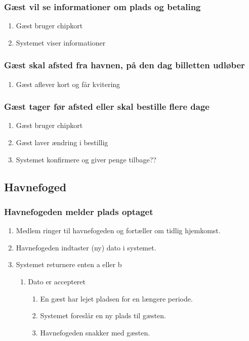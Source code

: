 \subsubsection{Gæst vil se informationer om plads og betaling}
  \begin{enumerate}
    \item Gæst bruger chipkort
    \item Systemet viser informationer
  \end{enumerate}

\subsubsection{Gæst skal afsted fra havnen, på den dag billetten udløber}
  \begin{enumerate}
    \item Gæst aflever kort og får kvitering
  \end{enumerate}

\subsubsection{Gæst tager før afsted eller skal bestille flere dage}
  \begin{enumerate}
    \item Gæst bruger chipkort
    \item Gæst laver ændring i bestillig
    \item Systemet konfirmere og giver penge tilbage??
  \end{enumerate}

\subsection{Havnefoged}

    \subsubsection{Havnefogeden melder plads optaget}

    \begin{enumerate}
      \item Medlem ringer til havnefogeden og fortæller om tidlig hjemkomst.
      \item Havnefogeden indtaster (ny) dato i systemet.
      \item Systemet returnere enten a eller b
      \begin{enumerate}
        \item Dato er accepteret
        \begin{enumerate}
          \item En gæst har lejet pladsen for en længere periode.
          \item Systemet foreslår en ny plads til gæsten.
          \item Havnefogeden snakker med gæsten.
        \end{enumerate}
      \end{enumerate}  
    \end{enumerate}


